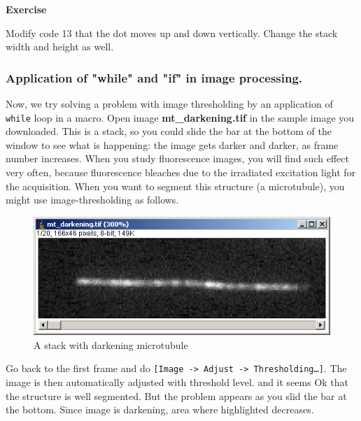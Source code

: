 \documentclass[11pt,a4paper,oneside]{report}
\newenvironment{indentexercise}[1]%
{{\setlength{\leftmargin}{2em}}%
\textbf{Exercise \thesubsection-#1}%
\begin{list}{}%
	\item%
}
{\end{list}}
\newcommand{\ijmenu}[1]{\texttt{\small#1}}
\newcommand{\ilcom}[1]{\texttt{\small#1}}
\begin{document}
\begin{indentexercise}{2}
Modify code 13 that the dot moves up and down vertically. Change the stack width and height as well. 
\end{indentexercise}

\subsubsection{Application of "while" and "if" in image processing.}
Now, we try solving a problem with image thresholding by an application of 
\ilcom{while} loop in a macro. Open image \textbf{mt\_darkening.tif} in the sample image you downloaded. 
This is a stack, so you could slide the bar at the bottom of the window to see what is happening: 
the image gets darker and darker, as frame number increases. When you study fluorescence images, 
you will find such effect very often, because fluorescence bleaches due to the irradiated excitation light 
for the acquisition. 
When you want to segment this structure (a microtubule), you might use image-thresholding as follows. 

\begin{figure}[htbp]
\begin{center}
\includegraphics[scale=0.6]{fig/fig23441_mtStack.png}
\caption{A stack with darkening microtubule}
\label{fig:MTstack}
\end{center}
\end{figure} 

Go back to the first frame and do \ijmenu{[Image -> Adjust -> Thresholding\ldots]}. The image is then automatically adjusted with threshold level. and it seems Ok that the structure is well segmented. But the problem appears as you slid the bar at the bottom. Since image is darkening, area where highlighted decreases. 
\end{document}
